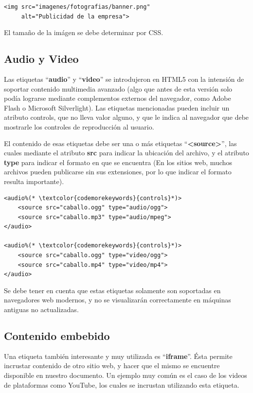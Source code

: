 \begin{lstlisting}[language=XHTML]
<img src="imagenes/fotografias/banner.png"
     alt="Publicidad de la empresa">
\end{lstlisting}

El tamaño de la imágen se debe determinar por CSS.

\subsection*{Audio y Video}

Las etiquetas ``\textbf{audio}'' y ``\textbf{video}'' se introdujeron en HTML5
con la intensión de soportar contenido multimedia avanzado (algo que antes de
esta versión solo podía lograrse mediante complementos externos del navegador,
como Adobe Flash o Microsoft Silverlight). Las etiquetas mencionadas pueden
incluir un atributo controls, que no lleva valor alguno, y que le indica al navegador
que debe mostrarle los controles de reproducción al usuario.

El contenido de esas etiquetas debe ser una o más etiquetas ``\textbf{<source>}'',
las cuales mediante el atributo \textbf{src} para indicar la ubicación del archivo,
y el atributo \textbf{type} para indicar el formato en que se encuentra (En los
sitios web, muchos archivos pueden publicarse sin sus extensiones, por lo que
indicar el formato resulta importante).

\begin{lstlisting}[language=XHTML]
<audio%(* \textcolor{codemorekeywords}{controls}*)>
    <source src="caballo.ogg" type="audio/ogg">
    <source src="caballo.mp3" type="audio/mpeg">
</audio>

<audio%(* \textcolor{codemorekeywords}{controls}*)>
    <source src="caballo.ogg" type="video/ogg">
    <source src="caballo.mp4" type="video/mp4">
</audio>
\end{lstlisting}

Se debe tener en cuenta que estas etiquetas solamente son soportadas en navegadores
web modernos, y no se visualizarán correctamente en máquinas antiguas no actualizadas.

\subsection*{Contenido embebido}

Una etiqueta también interesante y muy utilizada es ``\textbf{iframe}''.
Ésta permite incrustar contenido de otro sitio web, y hacer que el mismo se
encuentre disponible en nuestro documento. Un ejemplo muy común es el caso de los
videos de plataformas como YouTube, los cuales se incrustan utilizando esta etiqueta.

